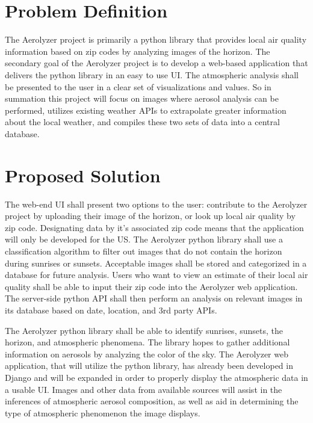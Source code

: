 \documentclass[letterpaper,10pt,draftclsnofoot,onecolumn]{IEEEtran}
\begin{document}
\clearpage
\begin{flushleft}
\section{Problem Definition}
The Aerolyzer project is primarily a python library that provides local air quality information based on zip codes by analyzing images of the horizon. The secondary goal of the Aerolyzer project is to develop a web-based application that delivers the python library in an easy to use UI. The atmospheric analysis shall be presented to the user in a clear set of visualizations and values. So in summation this project will focus on images where aerosol analysis can be performed, utilizes existing weather APIs to extrapolate greater information about the local weather, and compiles these two sets of data into a central database.

\section{Proposed Solution}
The web-end UI shall present two options to the user: contribute to the Aerolyzer project by uploading their image of the horizon, or look up local air quality by zip code. Designating data by it's associated zip code means that the application will only be developed for the US. The Aerolyzer python library shall use a classification algorithm to filter out images that do not contain the horizon during sunrises or sunsets. Acceptable images shall be stored and categorized in a database for future analysis. Users who want to view an estimate of their local air quality shall be able to input their zip code into the Aerolyzer web application. The server-side python API shall then perform an analysis on relevant images in its database based on date, location, and 3rd party APIs. \par The Aerolyzer python library shall be able to identify sunrises, sunsets, the horizon, and atmospheric phenomena. The library hopes to gather additional information on aerosols by analyzing the color of the sky. The Aerolyzer web application, that will utilize the python library, has already been developed in Django and will be expanded in order to properly display the atmospheric data in a usable UI. Images and other data from available sources will assist in the inferences of atmospheric aerosol composition, as well as aid in determining the type of atmospheric phenomenon the image displays.


\end{flushleft}
\end{document}
